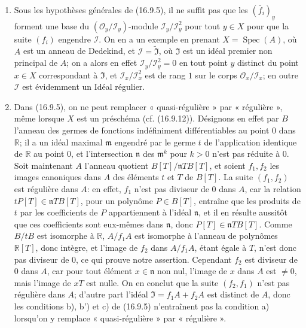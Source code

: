 \begin{remarks}[16.9.6]
\label{IV.16.9.6}
\begin{enumerate}
  \item[(i)] Sous les hypothèses générales de (16.9.5), il ne suffit pas que
  les $(\bar f_i)_y$ forment une base du
  $(\mathcal{O}_y/\mathscr{I}_y)$-module
  $\mathscr{I}_y/\mathscr{I}_y^2$ pour tout $y\in X$ pour que la suite
  $(f_i)$ engendre $\mathscr{I}$. On en a un exemple en
  prenant $X=\operatorname{Spec}(A)$, où $A$ est un anneau de Dedekind, et
  $\mathscr{I}=\widetilde{\mathfrak{I}}$, où $\mathfrak{I}$ est un idéal
  premier non principal de $A$; on a alors en effet
  $\mathscr{I}_y/\mathscr{I}_y^2=0$ en tout point $y$ distinct du point
  $x\in X$ correspondant à $\mathfrak{I}$, et
  $\mathscr{I}_x/\mathscr{I}_x^2$ est de rang $1$ sur le corps
  $\mathcal{O}_x/\mathscr{I}_x$; en outre $\mathscr{I}$ est évidemment un
  Idéal régulier.
  \item[(ii)] Dans (16.9.5), on ne peut remplacer « quasi-régulière » par
  « régulière », même lorsque $X$ est un préschéma (cf. (16.9.12)).
  Désignons en effet par $B$ l'anneau des germes de fonctions indéfiniment
  différentiables au point $0$ dans $\mathbb{R}$; il a un idéal maximal
  $\mathfrak{m}$ engendré par le germe $t$ de l'application identique de
  $\mathbb{R}$ au point $0$, et l'intersection $\mathfrak{n}$ des
  $\mathfrak{m}^k$ pour $k>0$ n'est pas réduite à $0$. Soit maintenant $A$
  l'anneau quotient $B[T]/\mathfrak{n}TB[T]$, et soient $f_1,f_2$ les images
  canoniques dans $A$ des éléments $t$ et $T$ de $B[T]$. La suite
  $(f_1,f_2)$ est régulière dans $A$: en effet, $f_1$ n'est pas diviseur de
  $0$ dans $A$, car la relation $tP[T]\in\mathfrak{n}TB[T]$, pour un
  polynôme $P\in B[T]$, entraîne que les produits de $t$ par les coefficients
  de $P$ appartiennent à l'idéal $\mathfrak{n}$, et il en résulte aussitôt que
  ces coefficients sont eux-mêmes dans $\mathfrak{n}$, donc
  $P[T]\in\mathfrak{n}TB[T]$. Comme $B/tB$ est isomorphe à $\mathbb{R}$,
  $A/f_1A$ est isomorphe à l'anneau de polynômes $\mathbb{R}[T]$, donc
  intègre, et l'image de $f_2$ dans $A/f_1A$, étant égale à $T$, n'est donc
  pas diviseur de $0$, ce qui prouve notre assertion. Cependant $f_2$ est
  diviseur de $0$ dans $A$, car pour tout élément $x\in\mathfrak{n}$ non nul,
  l'image de $x$ dans $A$ est $\ne0$, mais l'image de $xT$ est nulle. On en
  conclut que la suite $(f_2,f_1)$ n'est pas régulière dans $A$; d'autre part
  l'idéal $\mathfrak{I}=f_1A+f_2A$ est distinct de $A$, donc les conditions
  b), b') et c) de (16.9.5) n'entraînent pas la condition a) lorsqu'on y
  remplace « quasi-régulière » par « régulière ».
\end{enumerate}
\end{remarks}

